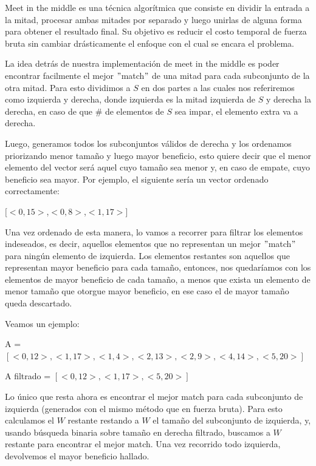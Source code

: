 \documentclass[a4paper]{article}
\begin{document}
Meet in the middle es una técnica algorítmica que consiste en dividir la entrada a la mitad, procesar ambas mitades por separado y luego unirlas de alguna forma para obtener el resultado final. Su objetivo es reducir el costo temporal de fuerza bruta sin cambiar drásticamente el enfoque con el cual se encara el problema.

La idea detrás de nuestra implementación de meet in the middle es poder encontrar facilmente el mejor $"$match$"$ de una mitad para cada subconjunto de la otra mitad. Para esto dividimos a $S$ en dos partes a las cuales nos referiremos como izquierda y derecha, donde izquierda es la mitad izquierda de $S$ y derecha la derecha, en caso de que \# de elementos de $S$ sea impar, el elemento extra va a derecha.

Luego, generamos todos los subconjuntos válidos de derecha y los ordenamos priorizando menor tamaño y luego mayor beneficio, esto quiere decir que el menor elemento del vector será aquel cuyo tamaño sea menor y, en caso de empate, cuyo beneficio sea mayor. Por ejemplo, el siguiente sería un vector ordenado correctamente:

\begin{center}
$[$$<0,15>$,$<0,8>$,$<1,17>$$]$
\end{center}

Una vez ordenado de esta manera, lo vamos a recorrer para filtrar los elementos indeseados, es decir, aquellos elementos que no representan un mejor $"$match$"$ para ningún elemento de izquierda. Los elementos restantes son aquellos que representan mayor beneficio para cada tamaño, entonces, nos quedaríamos con los elementos de mayor beneficio de cada tamaño, a menos que exista un elemento de menor tamaño que otorgue mayor beneficio, en ese caso el de mayor tamaño queda descartado. 

Veamos un ejemplo:

\begin{center}
A = $[<0,12>,<1,17>,<1,4>,<2,13>,<2,9>,<4,14>,<5,20>]$

A filtrado = $[<0,12>,<1,17>,<5,20>]$
\end{center}

Lo único que resta ahora es encontrar el mejor match para cada subconjunto de izquierda (generados con el mismo método que en fuerza bruta). Para esto calculamos el $W$ restante restando a $W$ el tamaño del subconjunto de izquierda, y, usando búsqueda binaria sobre tamaño en derecha filtrado, buscamos a $W$ restante para encontrar el mejor match.
Una vez recorrido todo izquierda, devolvemos el mayor beneficio hallado.
\end{document}
